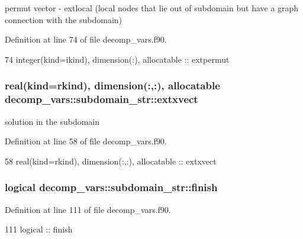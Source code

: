 permut vector -\/ extlocal (local nodes that lie out of subdomain but have a graph connection with the subdomain) 



Definition at line 74 of file decomp\+\_\+vars.\+f90.


\begin{DoxyCode}
74     \textcolor{keywordtype}{integer(kind=ikind)}, \textcolor{keywordtype}{dimension(:)}, \textcolor{keywordtype}{allocatable} :: extpermut
\end{DoxyCode}
\subsubsection[{extxvect}]{\setlength{\rightskip}{0pt plus 5cm}real(kind=rkind), dimension(\+:,\+:), allocatable decomp\+\_\+vars\+::subdomain\+\_\+str\+::extxvect}\label{structdecomp__vars_1_1subdomain__str_a071cf6782e4348efa4dc1bc19391d32e}


solution in the subdomain 



Definition at line 58 of file decomp\+\_\+vars.\+f90.


\begin{DoxyCode}
58     \textcolor{keywordtype}{real(kind=rkind)}, \textcolor{keywordtype}{dimension(:,:)}, \textcolor{keywordtype}{allocatable} :: extxvect
\end{DoxyCode}
\subsubsection[{finish}]{\setlength{\rightskip}{0pt plus 5cm}logical decomp\+\_\+vars\+::subdomain\+\_\+str\+::finish}\label{structdecomp__vars_1_1subdomain__str_a18bc231f7d0711f1b9b7786ee5346d31}


Definition at line 111 of file decomp\+\_\+vars.\+f90.


\begin{DoxyCode}
111     \textcolor{keywordtype}{logical} :: finish
\end{DoxyCode}

